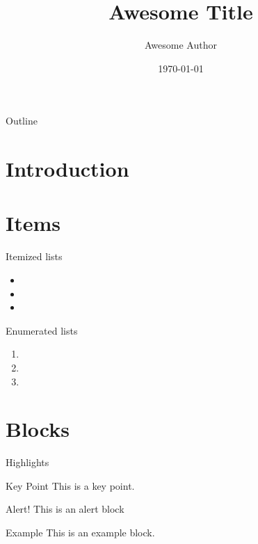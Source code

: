 \documentclass{beamer}
\title{Awesome Title}
\author{Awesome Author}
\date{\today}
\begin{document}
\titlepage

\begin{frame}{Outline}
  \tableofcontents
\end{frame}

\section{Introduction}

\begin{frame}
  \lipsum[1][1-8]
\end{frame}

\begin{frame}
  \lipsum[2][1-8]
\end{frame}

\section{Items}
\begin{frame}{Itemized lists}
  \begin{itemize}
    \item \lipsum[2][1]
    \item \lipsum[4][1]
    \item \lipsum[6][1]
  \end{itemize}
\end{frame}

\begin{frame}{Enumerated lists}
  \begin{enumerate}
    \item \lipsum[3][2]
    \item \lipsum[5][2]
    \item \lipsum[7][2]
 \end{enumerate}
\end{frame}

\section{Blocks}
\begin{frame}{Highlights}
  \begin{block}{Key Point}
    This is a key point.
  \end{block}
  \begin{alertblock}{Alert!}
    This is an alert block
  \end{alertblock}
  \begin{exampleblock}{Example}
    This is an example block.
  \end{exampleblock}
\end{frame}
\end{document}
